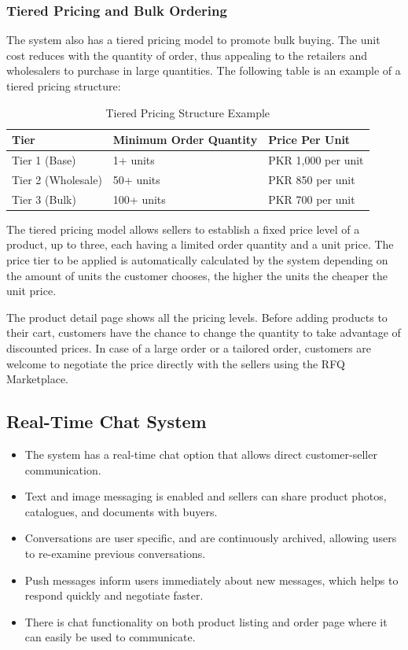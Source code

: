 \subsubsection{Tiered Pricing and Bulk Ordering}
The system also has a tiered pricing model to promote bulk buying. The unit cost reduces with the quantity of order, thus appealing to the retailers and wholesalers to purchase in large quantities. The following table is an example of a tiered pricing structure:

\renewcommand{\arraystretch}{1.2}
\begin{longtable}{|l|l|l|}
\caption{Tiered Pricing Structure Example}\label{tab:tiered_pricing}\\
\hline
\rowcolor{lightgray}
\textbf{Tier} & \textbf{Minimum Order Quantity} & \textbf{Price Per Unit}\\
\hline
\endhead
Tier 1 (Base) & 1+ units & PKR 1,000 per unit\\
\hline
Tier 2 (Wholesale) & 50+ units & PKR 850 per unit\\
\hline
Tier 3 (Bulk) & 100+ units & PKR 700 per unit\\
\hline
\end{longtable}
\renewcommand{\arraystretch}{1}


The tiered pricing model allows sellers to establish a fixed price level of a product, up to three, each having a limited order quantity and a unit price. The price tier to be applied is automatically calculated by the system depending on the amount of units the customer chooses, the higher the units the cheaper the unit price.

The product detail page shows all the pricing levels. Before adding products to their cart, customers have the chance to change the quantity to take advantage of discounted prices. In case of a large order or a tailored order, customers are welcome to negotiate the price directly with the sellers using the RFQ Marketplace.

\subsection{Real-Time Chat System}
\begin{itemize}
    \item The system has a real-time chat option that allows direct customer-seller communication.
    
    \item Text and image messaging is enabled and sellers can share product photos, catalogues, and documents with buyers.
    
    \item Conversations are user specific, and are continuously archived, allowing users to re-examine previous conversations.
    
    \item Push messages inform users immediately about new messages, which helps to respond quickly and negotiate faster.
    
    \item There is chat functionality on both product listing and order page where it can easily be used to communicate.
\end{itemize}

